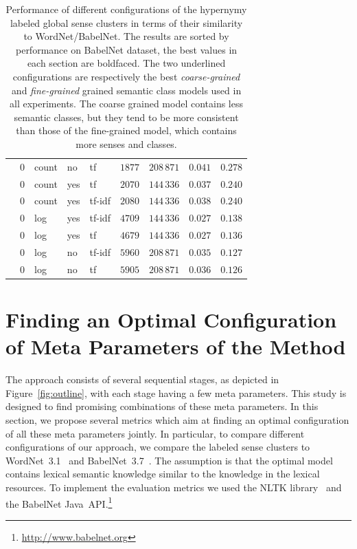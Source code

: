 \documentclass[10pt, a4paper]{article}
\begin{document}
\begin{table}[ht]
\begin{tabular}{p{1.25cm}|p{1.96cm}|p{1.4cm}|p{1.4cm}|p{1.6cm}|p{1.4cm}|p{1.4cm}|p{1.4cm}|p{1.4cm}}
 & $0$   & count & no  & tf     & $1877$ & $208\,871$ & $\mathbf{0.041}$ & $0.278$ \\
 & $0$   & count & yes & tf     & $2070$ & $144\,336$ & $0.037$ & $0.240$ \\
 & $0$   & count & yes & tf-idf & $2080$ & $144\,336$ & $0.038$ & $0.240$ \\
 & $0$   & log   & yes & tf-idf & $4709$ & $144\,336$ & $0.027$ & $0.138$ \\
 & $0$   & log   & yes & tf     & $4679$ & $144\,336$ & $0.027$ & $0.136$ \\
 & $0$   & log   & no  & tf-idf & $5960$ & $208\,871$ & $0.035$ & $0.127$ \\
 & $0$   & log   & no  & tf     & $5905$ & $208\,871$ & $0.036$ & $0.126$ 
\end{tabular}
\caption{Performance of different configurations of the hypernymy labeled global sense clusters in terms of their similarity to WordNet/BabelNet. The results are sorted by performance on BabelNet dataset, the best values in each section are boldfaced. The two underlined configurations are respectively the best \textit{coarse-grained} and \textit{fine-grained} grained semantic class models used in all experiments. The coarse grained model contains less semantic classes, but they tend to be more consistent than those of the fine-grained model, which contains more senses and classes. }
\label{tab:results}
\end{table}

\section{Finding an Optimal Configuration of Meta Parameters of the Method}
\label{sec:params}

The approach consists of several sequential stages, as depicted in Figure~\ref{fig:outline}, with each stage having a few meta parameters. This study is designed to find promising combinations of these meta parameters.  In this section, we propose several metrics which aim at finding an optimal configuration of all these meta parameters jointly. In particular, to compare different configurations of our approach, we compare the labeled sense clusters to WordNet~3.1~\cite{Fellbaum:98} and BabelNet~3.7~\cite{navigli2012babelnet}. The assumption is that the optimal model contains lexical semantic knowledge similar to the knowledge in the lexical resources.  To implement the evaluation metrics we used the NLTK library~\cite{Bird:09} and the BabelNet Java~API.\footnote{\url{http://www.babelnet.org}}
\end{document}
